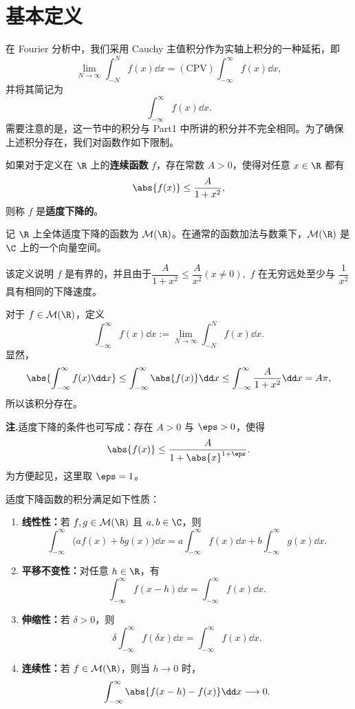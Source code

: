 \section{基本定义}

在 Fourier 分析中，我们采用 Cauchy 主值积分作为实轴上积分的一种延拓，即
\[
\lim_{N\to\infty}\int_{-N}^{N}f(x)\dd x
=(\mathrm{CPV})\int_{-\infty}^{\infty}f(x)\dd x,
\]
并将其简记为
\[
\int_{-\infty}^{\infty}f(x)\dd x.
\]
需要注意的是，这一节中的积分与 Part1 中所讲的积分并不完全相同。为了确保上述积分存在，我们对函数作如下限制。

\begin{definition}
	如果对于定义在 $\R$ 上的\textbf{连续函数} $f$，存在常数 $A>0$，使得对任意 $x\in\R$ 都有
	\[
	\abs{f(x)}\leq \frac{A}{1+x^2},
	\]
	则称 $f$ 是\textbf{适度下降的}。
	
	记 $\R$ 上全体适度下降的函数为 $\mathcal M(\R)$。在通常的函数加法与数乘下，$\mathcal M(\R)$ 是 $\C$ 上的一个向量空间。
	
\end{definition}
该定义说明 $f$ 是有界的，并且由于$\dfrac{A}{1+x^2}\leq \dfrac{A}{x^2}(x\neq0),$ $f$ 在无穷远处至少与 $\dfrac{1}{x^2}$ 具有相同的下降速度。


对于 $f\in\mathcal M(\R)$，定义
\[
\int_{-\infty}^{\infty}f(x)\dd x
:=\lim_{N\to\infty}\int_{-N}^{N}f(x)\dd x.
\]
显然，
\[
\abs{\int_{-\infty}^{\infty}f(x)\dd x}
\leq \int_{-\infty}^{\infty}\abs{f(x)}\dd x
\leq \int_{-\infty}^{\infty}\frac{A}{1+x^2}\dd x
=A\pi,
\]
所以该积分存在。

\textbf{注.}\quad 适度下降的条件也可写成：存在 $A>0$ 与 $\eps>0$，使得
\[
\abs{f(x)}\leq \frac{A}{1+\abs{x}^{1+\eps}}.
\]
为方便起见，这里取 $\eps=1$。

\begin{proposition}\label{prop:moderate-integral-properties}
	适度下降函数的积分满足如下性质：
	\begin{enumerate}[label=(\roman*)]
		\item \textbf{线性性：}若 $f,g\in\mathcal M(\R)$ 且 $a,b\in\C$，则
		\[
		\int_{-\infty}^{\infty}\bigl(af(x)+bg(x)\bigr)\dd x
		=a\int_{-\infty}^{\infty}f(x)\dd x
		+b\int_{-\infty}^{\infty}g(x)\dd x.
		\]
		
		\item \textbf{平移不变性：}对任意 $h\in\R$，有
		\[
		\int_{-\infty}^{\infty}f(x-h)\dd x
		=\int_{-\infty}^{\infty}f(x)\dd x.
		\]
		
		\item \textbf{伸缩性：}若 $\delta>0$，则
		\[
		\delta\int_{-\infty}^{\infty}f(\delta x)\dd x
		=\int_{-\infty}^{\infty}f(x)\dd x.
		\]
		
		\item \textbf{连续性：}若 $f\in\mathcal M(\R)$，则当 $h\to0$ 时，
		\[
		\int_{-\infty}^{\infty}\abs{f(x-h)-f(x)}\dd x\longrightarrow0.
		\]
	\end{enumerate}
\end{proposition}


